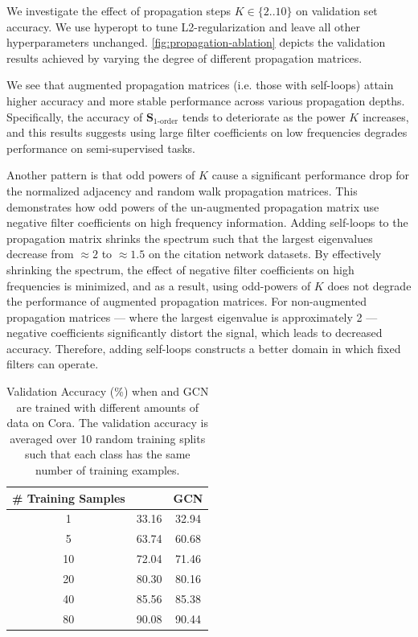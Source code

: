 We investigate the effect of propagation steps $K \in \{2..10\}$ on validation set accuracy. 
We use hyperopt to tune L2-regularization and leave all other hyperparameters unchanged. \autoref{fig:propagation-ablation} depicts the validation results achieved by varying the degree of different propagation matrices.

We see that augmented propagation matrices (i.e. those with self-loops) attain higher accuracy and more stable performance across various propagation depths. Specifically, the accuracy of $\mathbf{S}_{\text{1-order}}$ tends to deteriorate as the power $K$ increases, and this results suggests using large filter coefficients on low frequencies degrades \method{} performance on semi-supervised tasks.

Another pattern is that odd powers of $K$ cause a significant performance drop for the normalized adjacency and random walk propagation matrices. This demonstrates how odd powers of the un-augmented propagation matrix use negative filter coefficients on high frequency information. Adding self-loops to the propagation matrix shrinks the spectrum such that the largest eigenvalues decrease from $\approx 2$ to $\approx 1.5$ on the citation network datasets. By effectively shrinking the spectrum, the effect of negative filter coefficients on high frequencies is minimized, and as a result, using odd-powers of $K$ does not degrade the performance of augmented propagation matrices. For non-augmented propagation matrices --- where the largest eigenvalue is approximately 2 --- negative coefficients significantly distort the signal, which leads to decreased accuracy. Therefore, adding self-loops constructs a better domain in which fixed filters can operate. 

\begin{table}[h]
    \centering
    \begin{tabular}{c|cc}
    \toprule
    \# Training Samples & \method{} & GCN \\
    \midrule
    1 & 33.16 & 32.94 \\
    5 & 63.74 & 60.68 \\
    10 & 72.04 & 71.46 \\
    20 & 80.30 & 80.16 \\
    40 & 85.56 & 85.38 \\
    80 & 90.08 & 90.44 \\
    \bottomrule
    \end{tabular}
    \caption{Validation Accuracy (\%) when \method{} and GCN are trained with different amounts of data on Cora. The validation accuracy is averaged over 10 random training splits such that each class has the same number of training examples.} 
    \label{tab:data_ablation}
\end{table}

